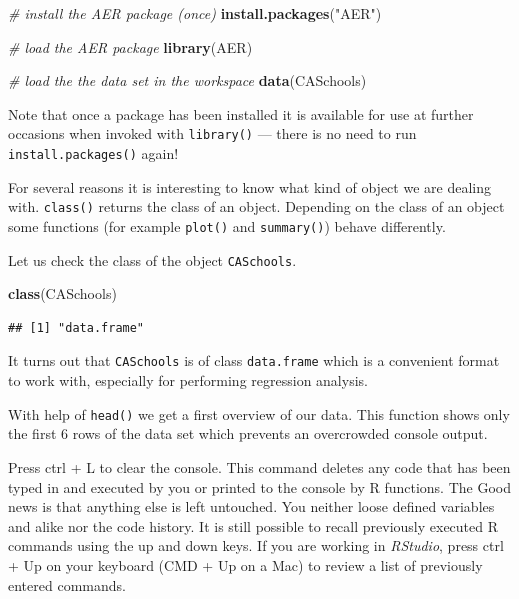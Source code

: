 \documentclass[]{book}
\newenvironment{Shaded}{\begin{snugshade}}{\end{snugshade}}
\newcommand{\KeywordTok}[1]{\textcolor[rgb]{0.13,0.29,0.53}{\textbf{#1}}}
\newcommand{\StringTok}[1]{\textcolor[rgb]{0.31,0.60,0.02}{#1}}
\newcommand{\CommentTok}[1]{\textcolor[rgb]{0.56,0.35,0.01}{\textit{#1}}}
\newcommand{\NormalTok}[1]{#1}
\theoremstyle{definition}
\theoremstyle{definition}
\theoremstyle{definition}
\theoremstyle{remark}
\let\BeginKnitrBlock\begin \let\EndKnitrBlock\end
\begin{document}
\begin{Shaded}
\begin{Highlighting}[]
\CommentTok{# install the AER package (once)}
\KeywordTok{install.packages}\NormalTok{(}\StringTok{"AER"}\NormalTok{)}

\CommentTok{# load the AER package }
\KeywordTok{library}\NormalTok{(AER)   }

\CommentTok{# load the the data set in the workspace}
\KeywordTok{data}\NormalTok{(CASchools) }
\end{Highlighting}
\end{Shaded}

Note that once a package has been installed it is available for use at
further occasions when invoked with \texttt{library()} --- there is no
need to run \texttt{install.packages()} again!

For several reasons it is interesting to know what kind of object we are
dealing with. \texttt{class()} returns the class of an object. Depending
on the class of an object some functions (for example \texttt{plot()}
and \texttt{summary()}) behave differently.

Let us check the class of the object \texttt{CASchools}.

\begin{Shaded}
\begin{Highlighting}[]
\KeywordTok{class}\NormalTok{(CASchools)}
\end{Highlighting}
\end{Shaded}

\begin{verbatim}
## [1] "data.frame"
\end{verbatim}

It turns out that \texttt{CASchools} is of class \texttt{data.frame}
which is a convenient format to work with, especially for performing
regression analysis.

With help of \texttt{head()} we get a first overview of our data. This
function shows only the first 6 rows of the data set which prevents an
overcrowded console output.

\BeginKnitrBlock{rmdnote}
Press ctrl + L to clear the console. This command deletes any code that
has been typed in and executed by you or printed to the console by R
functions. The Good news is that anything else is left untouched. You
neither loose defined variables and alike nor the code history. It is
still possible to recall previously executed R commands using the up and
down keys. If you are working in \emph{RStudio}, press ctrl + Up on your
keyboard (CMD + Up on a Mac) to review a list of previously entered
commands.
\EndKnitrBlock{rmdnote}
\end{document}
